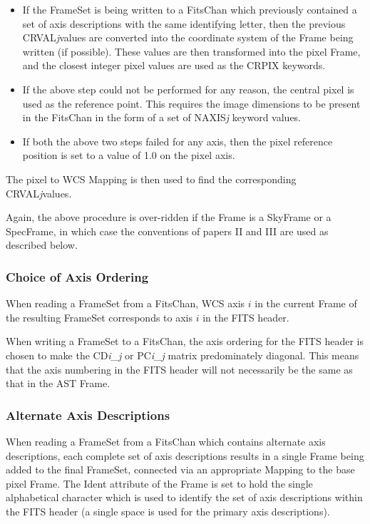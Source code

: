 \documentclass[twoside,11pt]{article}
\begin{document}
\begin{itemize}
\item If the FrameSet is being written to a FitsChan which previously
contained a set of axis descriptions with the same identifying letter,
then the previous CRVAL\emph{j}values are converted into the coordinate system
of the Frame being written (if possible). These values are then
transformed into the pixel Frame, and the closest integer pixel values
are used as the CRPIX keywords.
\item If the above step could not be performed for any reason, the
central pixel is used as the reference point. This requires the image
dimensions to be present in the FitsChan in the form of a set of
NAXIS\emph{j} keyword values.
\item If both the above two steps failed for any axis, then the pixel
reference position is set to a value of 1.0 on the pixel axis.
\end{itemize}

The pixel to WCS Mapping is then used to find the corresponding
CRVAL\emph{j}values.

Again, the above procedure is over-ridden if the Frame is a
SkyFrame or a SpecFrame, in which
case the conventions of papers II and III are used as described below.


\subsubsection{Choice of Axis Ordering}
When reading a FrameSet from a
FitsChan, WCS axis $i$ in the current
Frame of the
resulting FrameSet corresponds to axis $i$ in the FITS header.

When writing a FrameSet to a FitsChan, the axis ordering for the FITS
header is chosen to make the CD\emph{i\_j} or PC\emph{i\_j} matrix
predominately diagonal. This means that the axis numbering in the FITS
header will not necessarily be the same as that in the AST Frame.

\subsubsection{Alternate Axis Descriptions}
When reading a FrameSet from a
FitsChan which contains alternate axis descriptions,
each complete set of axis descriptions results in a single Frame being added
to the final FrameSet, connected via an appropriate
Mapping to the base pixel Frame. The Ident attribute of the Frame is set to hold the single alphabetical
character which is used to identify the set of axis descriptions within
the FITS header (a single space is used for the primary axis descriptions).
\end{document}

